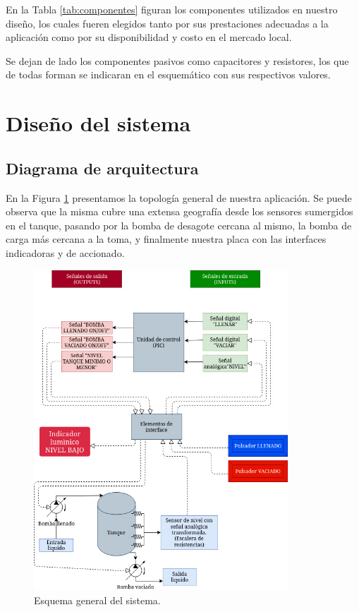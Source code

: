 ﻿\documentclass[a4paper]{article}
\begin{document}
En la Tabla \ref{tab:componentes} figuran los componentes 
utilizados en nuestro diseño, los cuales fueren elegidos tanto 
por sus prestaciones adecuadas a la aplicación como por su 
disponibilidad y costo en el mercado local.

Se dejan de lado los componentes pasivos como capacitores y 
resistores, los que de todas forman se indicaran en el esquemático
con sus respectivos valores.

\section{Diseño del sistema}

\subsection{Diagrama de arquitectura}

En la Figura \ref{fig:general} presentamos la topología 
general de nuestra aplicación. Se puede observa que 
la misma cubre una extensa geografía desde los sensores 
sumergidos en el tanque, pasando por la bomba de desagote
cercana al mismo, la bomba de carga más cercana a la toma,
y finalmente nuestra placa con las interfaces indicadoras 
y de accionado. 

\begin{figure}[h]\centering
    \includegraphics[height=12cm]{diagrama_sistema.jpg}
    \caption{Esquema general del sistema.}\label{fig:general}
\end{figure}
\end{document}
